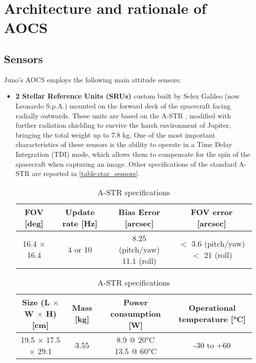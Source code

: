 \section{Architecture and rationale of AOCS}
\label{sec:AOCS_architecture_rationale}



\subsection{Sensors}
\label{subsec:Sensors}

Juno's AOCS employs the following main attitude sensors:

\begin{itemize}
    \item \textbf{2 Stellar Reference Units (SRUs)} custom built by Selex Galileo (now Leonardo S.p.A.) mounted on the forward deck of the spacecraft facing radially outwards. These units are based on the A-STR \cite{SRU}, modified with further radiation shielding to survive the harsh environment of Jupiter, bringing the total weight up to 7.8 kg. One of the most important characteristics of these sensors is the ability to operate in a Time Delay Integration (TDI) mode, which allows them to compensate for the spin of the spacecraft when capturing an image. Other specifications of the standard A-STR are reported in \autoref{table:star_sensors}.
    \begin{table}[H]
        \renewcommand{\arraystretch}{1.3}
        \centering
        \begin{tabular}{|c|c|c|c|}
            \hline
            \textbf{FOV [deg]} & \textbf{Update rate [Hz]} & \textbf{Bias Error [arcsec]} & \textbf{FOV error [arcsec]} \\
            \hline
            16.4 $\times$ 16.4 & 4 or 10 & \makecell{8.25 (pitch/yaw) \\ 11.1 (roll)} & \makecell{$<$ 3.6 (pitch/yaw) \\ $<$ 21 (roll)} \\   
            \hline
        \end{tabular}

        \vspace{5mm}

        \begin{tabular}{|c|c|c|c|}
            \hline
            \textbf{Size (L $\boldsymbol{\times}$ W $\boldsymbol{\times}$ H) [cm]} & \textbf{Mass [kg]} & \textbf{Power consumption [W]} & \textbf{Operational temperature [°C]} \\
            \hline
            19.5 $\times$ 17.5 $\times$ 29.1 & 3.55 & \makecell{8.9 @ 20°C \\ 13.5 @ 60°C} & -30 to +60\\
            \hline
        \end{tabular}
        \caption{A-STR specifications}
        \label{table:star_sensors}
    \end{table}
 

\end{itemize}
